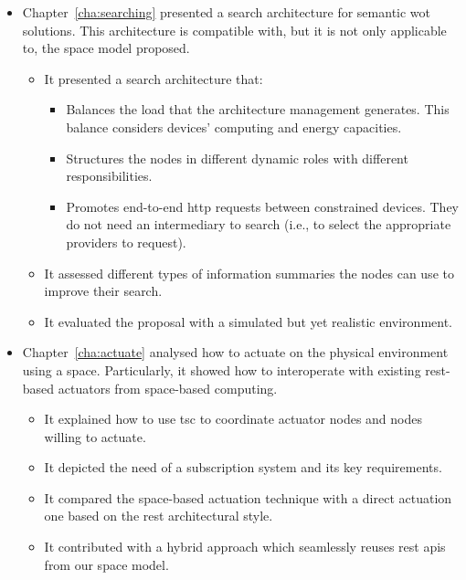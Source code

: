 \begin{itemize}
  \item Chapter~\ref{cha:searching} presented a search architecture for semantic \ac{wot} solutions.
        This architecture is compatible with, but it is not only applicable to, the space model proposed.
    \begin{itemize}
      \item It presented a search architecture that:
      \begin{itemize}
	\item Balances the load that the architecture management generates.
	      This balance considers devices' computing and energy capacities.
	\item Structures the nodes in different dynamic roles with different responsibilities. %
	\item Promotes end-to-end \ac{http} requests between constrained devices.
	      They do not need an intermediary to search (i.e., to select the appropriate providers to request). %
      \end{itemize}
      \item It assessed different types of information summaries the nodes can use to improve their search.
      \item It evaluated the proposal with a simulated but yet realistic environment.
    \end{itemize}
    
  \item Chapter~\ref{cha:actuate} analysed how to actuate on the physical environment using a space. %
	Particularly, it showed how to interoperate with existing \ac{rest}-based actuators from space-based computing.
    \begin{itemize}
      \item It explained how to use \ac{tsc} to coordinate actuator nodes and nodes willing to actuate.
      \item It depicted the need of a subscription system and its key requirements.
      \item It compared the space-based actuation technique with a direct actuation one based on the \ac{rest} architectural style. %
      \item It contributed with a hybrid approach which seamlessly reuses \ac{rest} \acp{api} from our space model.
    \end{itemize}
  

\end{itemize}
